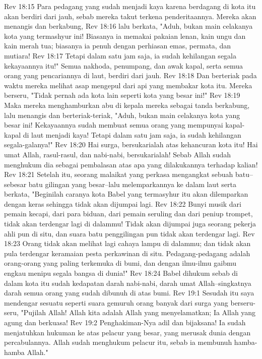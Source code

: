 Rev 18:15  Para pedagang yang sudah menjadi kaya karena berdagang di kota itu akan berdiri dari jauh, sebab mereka takut terkena penderitaannya. Mereka akan menangis dan berkabung,
Rev 18:16  lalu berkata, "Aduh, bukan main celakanya kota yang termashyur ini! Biasanya ia memakai pakaian lenan, kain ungu dan kain merah tua; biasanya ia penuh dengan perhiasan emas, permata, dan mutiara!
Rev 18:17  Tetapi dalam satu jam saja, ia sudah kehilangan segala kekayaannya itu!" Semua nakhoda, penumpang, dan awak kapal, serta semua orang yang pencariannya di laut, berdiri dari jauh.
Rev 18:18  Dan berteriak pada waktu mereka melihat asap mengepul dari api yang membakar kota itu. Mereka berseru, "Tidak pernah ada kota lain seperti kota yang besar ini!"
Rev 18:19  Maka mereka menghamburkan abu di kepala mereka sebagai tanda berkabung, lalu menangis dan berteriak-teriak, "Aduh, bukan main celakanya kota yang besar ini! Kekayaannya sudah membuat semua orang yang mempunyai kapal-kapal di laut menjadi kaya! Tetapi dalam satu jam saja, ia sudah kehilangan segala-galanya!"
Rev 18:20  Hai surga, bersukarialah atas kehancuran kota itu! Hai umat Allah, rasul-rasul, dan nabi-nabi, bersukarialah! Sebab Allah sudah menghukum dia sebagai pembalasan atas apa yang dilakukannya terhadap kalian!
Rev 18:21  Setelah itu, seorang malaikat yang perkasa mengangkat sebuah batu--sebesar batu gilingan yang besar--lalu melemparkannya ke dalam laut serta berkata, "Beginilah caranya kota Babel yang termasyhur itu akan dilemparkan dengan keras sehingga tidak akan dijumpai lagi.
Rev 18:22  Bunyi musik dari pemain kecapi, dari para biduan, dari pemain seruling dan dari peniup trompet, tidak akan terdengar lagi di dalammu! Tidak akan dijumpai juga seorang pekerja ahli pun di situ, dan suara batu penggilingan pun tidak akan terdengar lagi.
Rev 18:23  Orang tidak akan melihat lagi cahaya lampu di dalammu; dan tidak akan pula terdengar keramaian pesta perkawinan di situ. Pedagang-pedagang adalah orang-orang yang paling terkemuka di bumi, dan dengan ilmu-ilmu gaibmu engkau menipu segala bangsa di dunia!"
Rev 18:24  Babel dihukum sebab di dalam kota itu sudah kedapatan darah nabi-nabi, darah umat Allah--singkatnya darah semua orang yang sudah dibunuh di atas bumi.
Rev 19:1  Sesudah itu saya mendengar sesuatu seperti suara gemuruh orang banyak dari surga yang berseru-seru, "Pujilah Allah! Allah kita adalah Allah yang menyelamatkan; Ia Allah yang agung dan berkuasa!
Rev 19:2  Penghakiman-Nya adil dan bijaksana! Ia sudah menjatuhkan hukuman ke atas pelacur yang besar, yang merusak dunia dengan percabulannya. Allah sudah menghukum pelacur itu, sebab ia membunuh hamba-hamba Allah."
